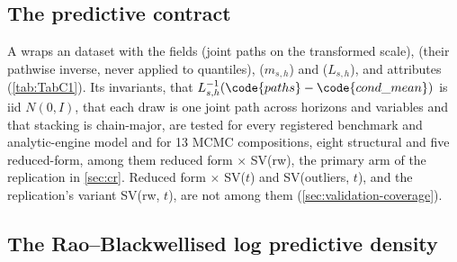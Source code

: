 \subsection{The predictive contract}\label{sec:eval-contract}

A  wraps an  dataset \citep{hoyer2017xarray} with the fields
 (joint paths on the transformed scale),  (their pathwise inverse,
never applied to quantiles),  ($m_{s,h}$) and  ($L_{s,h}$), and
attributes (\cref{tab:TabC1}).
Its invariants, that $L_{s,h}^{-1}(\code{paths} - \code{cond\_mean})$ is iid $N(0, I)$, that each
draw is one joint path across horizons and variables and that stacking is chain-major, are tested
for every registered benchmark and analytic-engine model and for 13 MCMC compositions, eight
structural and five reduced-form, among them reduced form $\times$ SV(rw), the primary arm of the
replication in \cref{sec:cr}.
Reduced form $\times$ SV($t$) and SV(outliers, $t$), and the replication's variant SV(rw, $t$), are
not among them (\cref{sec:validation-coverage}).

\subsection{The Rao--Blackwellised log predictive density}\label{sec:eval-lpd}

